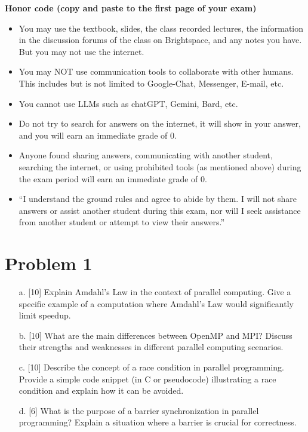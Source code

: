 \documentclass{article}
\begin{document}
\textbf{Honor code (copy and paste to the first page of your exam)}
\begin{itemize}
    \item You may use the textbook, slides, the class recorded lectures, the information in the discussion forums of the class on Brightspace, and any notes you have. But you may not use the internet.
    \item You may NOT use communication tools to collaborate with other humans. This includes but is not limited to Google-Chat, Messenger, E-mail, etc.
    \item You cannot use LLMs such as chatGPT, Gemini, Bard, etc.
    \item Do not try to search for answers on the internet, it will show in your answer, and you will earn an immediate grade of 0.
    \item Anyone found sharing answers, communicating with another student, searching the internet, or using prohibited tools (as mentioned above) during the exam period will earn an immediate grade of 0.
    \item “I understand the ground rules and agree to abide by them. I will not share answers or assist another student during this exam, nor will I seek assistance from another student or attempt to view their answers.”
\end{itemize}


\section*{Problem 1}
\begin{enumerate}
    \item[a.] [10] Explain Amdahl's Law in the context of parallel computing.  Give a specific example of a computation where Amdahl's Law would significantly limit speedup.
    \item[b.] [10] What are the main differences between OpenMP and MPI?  Discuss their strengths and weaknesses in different parallel computing scenarios.
    \item[c.] [10] Describe the concept of a race condition in parallel programming. Provide a simple code snippet (in C or pseudocode) illustrating a race condition and explain how it can be avoided.
    \item[d.] [6]  What is the purpose of a barrier synchronization in parallel programming? Explain a situation where a barrier is crucial for correctness.
\end{enumerate}
\end{document}
